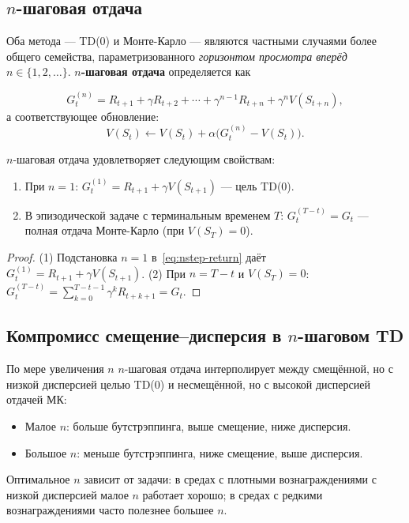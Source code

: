 \subsection{$n$-шаговая отдача}

Оба метода --- TD(0) и Монте-Карло --- являются частными случаями более общего семейства, параметризованного \emph{горизонтом просмотра вперёд} $n\in\{1,2,\dots\}$.  \textbf{$n$-шаговая отдача} определяется как

\begin{equation}
\label{eq:nstep-return}
G_t^{(n)} = R_{t+1} + \gamma R_{t+2} + \cdots + \gamma^{n-1}R_{t+n} + \gamma^n V(S_{t+n}),
\end{equation}
а соответствующее обновление:
\begin{equation}
\label{eq:nstep-update}
V(S_t) \leftarrow V(S_t) + \alpha\bigl(G_t^{(n)} - V(S_t)\bigr).
\end{equation}

\begin{proposition}
$n$-шаговая отдача удовлетворяет следующим свойствам:
\begin{enumerate}
  \item При $n=1$: $G_t^{(1)} = R_{t+1}+\gamma V(S_{t+1})$ --- цель TD(0).
  \item В эпизодической задаче с терминальным временем $T$: $G_t^{(T-t)} = G_t$ --- полная отдача Монте-Карло (при $V(S_T)=0$).
\end{enumerate}
\end{proposition}

\begin{proof}
(1) Подстановка $n=1$ в~\eqref{eq:nstep-return} даёт $G_t^{(1)} = R_{t+1}+\gamma V(S_{t+1})$.  (2) При $n=T-t$ и $V(S_T)=0$: $G_t^{(T-t)} = \sum_{k=0}^{T-t-1}\gamma^k R_{t+k+1} = G_t$.
\end{proof}

\subsection{Компромисс смещение--дисперсия в $n$-шаговом TD}

По мере увеличения $n$ $n$-шаговая отдача интерполирует между смещённой, но с низкой дисперсией целью TD(0) и несмещённой, но с высокой дисперсией отдачей МК:
\begin{itemize}[leftmargin=*]
  \item Малое $n$: больше бутстрэппинга, выше смещение, ниже дисперсия.
  \item Большое $n$: меньше бутстрэппинга, ниже смещение, выше дисперсия.
\end{itemize}
Оптимальное $n$ зависит от задачи: в средах с плотными вознаграждениями с низкой дисперсией малое $n$ работает хорошо; в средах с редкими вознаграждениями часто полезнее большее $n$.


